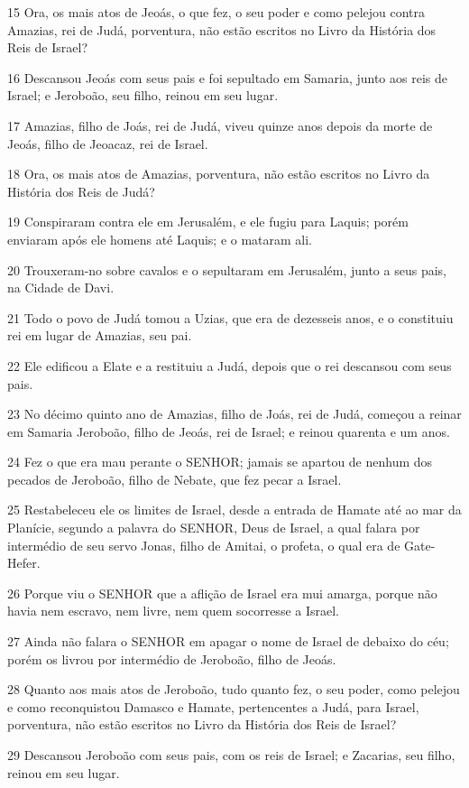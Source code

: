 \par 15 Ora, os mais atos de Jeoás, o que fez, o seu poder e como pelejou contra Amazias, rei de Judá, porventura, não estão escritos no Livro da História dos Reis de Israel?
\par 16 Descansou Jeoás com seus pais e foi sepultado em Samaria, junto aos reis de Israel; e Jeroboão, seu filho, reinou em seu lugar.
\par 17 Amazias, filho de Joás, rei de Judá, viveu quinze anos depois da morte de Jeoás, filho de Jeoacaz, rei de Israel.
\par 18 Ora, os mais atos de Amazias, porventura, não estão escritos no Livro da História dos Reis de Judá?
\par 19 Conspiraram contra ele em Jerusalém, e ele fugiu para Laquis; porém enviaram após ele homens até Laquis; e o mataram ali.
\par 20 Trouxeram-no sobre cavalos e o sepultaram em Jerusalém, junto a seus pais, na Cidade de Davi.
\par 21 Todo o povo de Judá tomou a Uzias, que era de dezesseis anos, e o constituiu rei em lugar de Amazias, seu pai.
\par 22 Ele edificou a Elate e a restituiu a Judá, depois que o rei descansou com seus pais.
\par 23 No décimo quinto ano de Amazias, filho de Joás, rei de Judá, começou a reinar em Samaria Jeroboão, filho de Jeoás, rei de Israel; e reinou quarenta e um anos.
\par 24 Fez o que era mau perante o SENHOR; jamais se apartou de nenhum dos pecados de Jeroboão, filho de Nebate, que fez pecar a Israel.
\par 25 Restabeleceu ele os limites de Israel, desde a entrada de Hamate até ao mar da Planície, segundo a palavra do SENHOR, Deus de Israel, a qual falara por intermédio de seu servo Jonas, filho de Amitai, o profeta, o qual era de Gate-Hefer.
\par 26 Porque viu o SENHOR que a aflição de Israel era mui amarga, porque não havia nem escravo, nem livre, nem quem socorresse a Israel.
\par 27 Ainda não falara o SENHOR em apagar o nome de Israel de debaixo do céu; porém os livrou por intermédio de Jeroboão, filho de Jeoás.
\par 28 Quanto aos mais atos de Jeroboão, tudo quanto fez, o seu poder, como pelejou e como reconquistou Damasco e Hamate, pertencentes a Judá, para Israel, porventura, não estão escritos no Livro da História dos Reis de Israel?
\par 29 Descansou Jeroboão com seus pais, com os reis de Israel; e Zacarias, seu filho, reinou em seu lugar.


